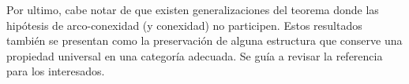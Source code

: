 Por ultimo, cabe notar de que existen generalizaciones del teorema
\vank donde las hipótesis de arco-conexidad (y conexidad) no participen.
Estos resultados también se presentan como la preservación de alguna
estructura que conserve una propiedad universal en una categoría
adecuada. Se guía a revisar la referencia \cite{brown} para los
interesados.
